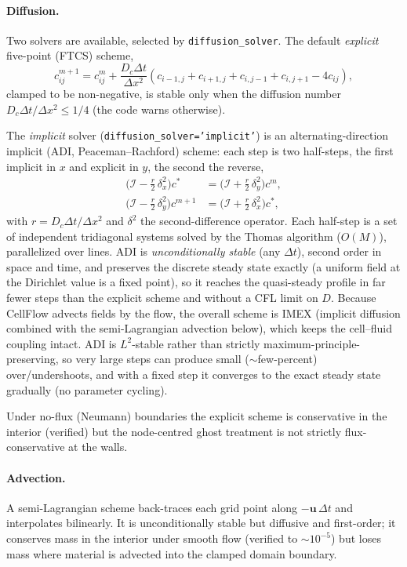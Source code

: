 \documentclass[11pt]{article}
\newcommand{\vu}{\bm{u}}
\newcommand{\dt}{\Delta t}
\newcommand{\dx}{\Delta x}
\begin{document}
\paragraph{Diffusion.} Two solvers are available, selected by
\texttt{diffusion\_solver}. The default \emph{explicit} five-point (FTCS) scheme,
\begin{equation}
  c^{m+1}_{ij} = c^{m}_{ij}
  + \frac{D_c \dt}{\dx^2}\left(c_{i-1,j}+c_{i+1,j}+c_{i,j-1}+c_{i,j+1}-4c_{ij}\right),
\end{equation}
clamped to be non-negative, is stable only when the diffusion number
$D_c\dt/\dx^2 \le 1/4$ (the code warns otherwise).

The \emph{implicit} solver (\texttt{diffusion\_solver='implicit'}) is an
alternating-direction implicit (ADI, Peaceman--Rachford) scheme: each step is two
half-steps, the first implicit in $x$ and explicit in $y$, the second the reverse,
\begin{align}
  \big(\mathcal{I} - \tfrac{r}{2}\,\delta_x^2\big)c^{*}
   &= \big(\mathcal{I} + \tfrac{r}{2}\,\delta_y^2\big)c^{m}, \\
  \big(\mathcal{I} - \tfrac{r}{2}\,\delta_y^2\big)c^{m+1}
   &= \big(\mathcal{I} + \tfrac{r}{2}\,\delta_x^2\big)c^{*},
\end{align}
with $r = D_c\dt/\dx^2$ and $\delta^2$ the second-difference operator. Each
half-step is a set of independent tridiagonal systems solved by the Thomas
algorithm ($O(M)$), parallelized over lines. ADI is \emph{unconditionally stable}
(any $\dt$), second order in space and time, and preserves the discrete steady
state exactly (a uniform field at the Dirichlet value is a fixed point), so it
reaches the quasi-steady profile in far fewer steps than the explicit scheme and
without a CFL limit on $D$. Because CellFlow advects fields by the flow, the
overall scheme is IMEX (implicit diffusion combined with the semi-Lagrangian
advection below), which keeps the cell--fluid coupling intact. ADI is
$L^2$-stable rather than strictly maximum-principle-preserving, so very large
steps can produce small ($\sim$few-percent) over/undershoots, and with a fixed
step it converges to the exact steady state gradually (no parameter cycling).

Under no-flux (Neumann) boundaries the explicit scheme is conservative in the
interior (verified) but the node-centred ghost treatment is not strictly
flux-conservative at the walls.

\paragraph{Advection.} A semi-Lagrangian scheme back-traces each grid point
along $-\vu\,\dt$ and interpolates bilinearly. It is unconditionally stable but
diffusive and first-order; it conserves mass in the interior under smooth flow
(verified to $\sim 10^{-5}$) but loses mass where material is advected into the
clamped domain boundary.
\end{document}
